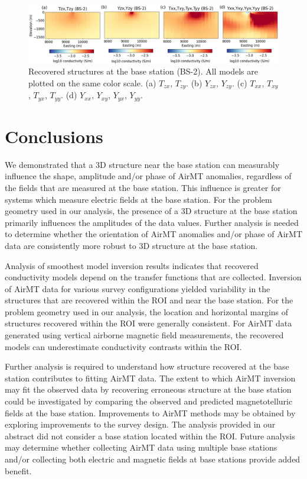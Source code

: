 \documentclass{segabs}
\begin{document}
\begin{figure}
\includegraphics[width=2\columnwidth]{images/inversion_base.png}
\vspace{-6pt}
\caption{Recovered structures at the base station (BS-2). All models are plotted on the same color scale. (a) $T_{zx}$, $T_{zy}$. (b) $Y_{zx}$, $Y_{zy}$. (c) $T_{xx}$, $T_{xy}$, $T_{yx}$, $T_{yy}$. (d) $Y_{xx}$, $Y_{xy}$, $Y_{yx}$, $Y_{yy}$.}
\label{fig:inversion_base}
\vspace{-15pt}
\end{figure}

\section{Conclusions}
\vspace{-5pt}
We demonstrated that a 3D structure near the base station can measurably influence the shape, amplitude and/or phase of AirMT anomalies, regardless of the fields that are measured at the base station. This influence is greater for systems which measure electric fields at the base station. For the problem geometry used in our analysis, the presence of a 3D structure at the base station primarily influences the amplitudes of the data values. Further analysis is needed to determine whether the orientation of AirMT anomalies and/or phase of AirMT data are consistently more robust to 3D structure at the base station.

Analysis of smoothest model inversion results indicates that recovered conductivity models depend on the transfer functions that are collected. Inversion of AirMT data for various survey configurations yielded variability in the structures that are recovered within the ROI and near the base station. For the problem geometry used in our analysis, the location and horizontal margins of structures recovered within the ROI were generally consistent. For AirMT data generated using vertical airborne magnetic field measurements, the recovered models can underestimate conductivity contrasts within the ROI. 

Further analysis is required to understand how structure recovered at the base station contributes to fitting AirMT data. The extent to which AirMT inversion may fit the observed data by recovering erroneous structure at the base station could be investigated by comparing the observed and predicted magnetotelluric fields at the base station. Improvements to AirMT methods may be obtained by exploring improvements to the survey design. The analysis provided in our abstract did not consider a base station located within the ROI. Future analysis may determine whether collecting AirMT data using multiple base stations and/or collecting both electric and magnetic fields at base stations provide added benefit. 

\onecolumn

\end{document}
